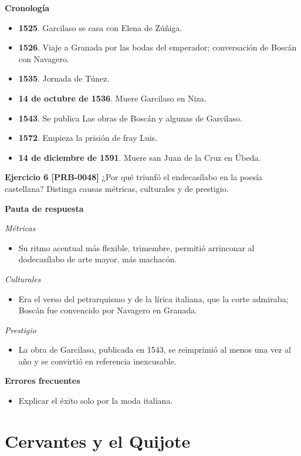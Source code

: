 \documentclass{book}
\begin{document}
\noindent\textbf{Cronología}
\begin{itemize}
\item \textbf{1525}. Garcilaso se casa con Elena de Zúñiga.
\item \textbf{1526}. Viaje a Granada por las bodas del emperador; conversación de Boscán con Navagero.
\item \textbf{1535}. Jornada de Túnez.
\item \textbf{14 de octubre de 1536}. Muere Garcilaso en Niza.
\item \textbf{1543}. Se publica Las obras de Boscán y algunas de Garcilaso.
\item \textbf{1572}. Empieza la prisión de fray Luis.
\item \textbf{14 de diciembre de 1591}. Muere san Juan de la Cruz en Úbeda.
\end{itemize}

\noindent\textbf{Ejercicio 6 [PRB-0048]}
¿Por qué triunfó el endecasílabo en la poesía castellana? Distinga causas métricas, culturales y de prestigio.


\noindent\textbf{Pauta de respuesta}

\noindent\textit{Métricas}
\begin{itemize}
\item Su ritmo acentual más flexible, trimembre, permitió arrinconar al dodecasílabo de arte mayor, más machacón.
\end{itemize}

\noindent\textit{Culturales}
\begin{itemize}
\item Era el verso del petrarquismo y de la lírica italiana, que la corte admiraba; Boscán fue convencido por Navagero en Granada.
\end{itemize}

\noindent\textit{Prestigio}
\begin{itemize}
\item La obra de Garcilaso, publicada en 1543, se reimprimió al menos una vez al año y se convirtió en referencia inexcusable.
\end{itemize}

\noindent\textbf{Errores frecuentes}
\begin{itemize}
\item Explicar el éxito solo por la moda italiana.
\end{itemize}

\section{Cervantes y el Quijote}
\end{document}
